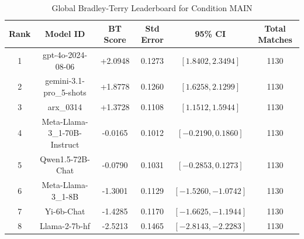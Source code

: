 \begin{table}[ht]
\centering
\caption{Global Bradley-Terry Leaderboard for Condition \textsc{MAIN}}
\label{tab:leaderboard_main}
\begin{tabular}{cccccc}
\hline
\textbf{Rank} & \textbf{Model ID} & \textbf{BT Score} & \textbf{Std Error} & \textbf{95\% CI} & \textbf{Total Matches} \\
\hline
1 & gpt-4o-2024-08-06 & +2.0948 & 0.1273 & $[1.8402, 2.3494]$ & 1130 \\
2 & gemini-3.1-pro\_5-shots & +1.8778 & 0.1260 & $[1.6258, 2.1299]$ & 1130 \\
3 & arx\_0314 & +1.3728 & 0.1108 & $[1.1512, 1.5944]$ & 1130 \\
4 & Meta-Llama-3\_1-70B-Instruct & -0.0165 & 0.1012 & $[-0.2190, 0.1860]$ & 1130 \\
5 & Qwen1.5-72B-Chat & -0.0790 & 0.1031 & $[-0.2853, 0.1273]$ & 1130 \\
6 & Meta-Llama-3\_1-8B & -1.3001 & 0.1129 & $[-1.5260, -1.0742]$ & 1130 \\
7 & Yi-6b-Chat & -1.4285 & 0.1170 & $[-1.6625, -1.1944]$ & 1130 \\
8 & Llama-2-7b-hf & -2.5213 & 0.1465 & $[-2.8143, -2.2283]$ & 1130 \\
\hline
\end{tabular}
\end{table}
